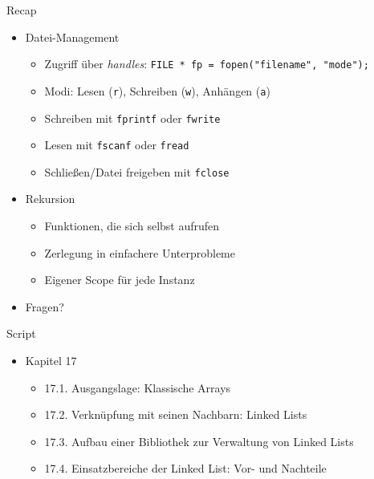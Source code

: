 
\begin{frame}[t,plain]
\titlepage
\end{frame}


\begin{frame}[fragile]{Recap}
%
\begin{itemize}
\item Datei-Management
	\begin{itemize}
	\item Zugriff über \emph{handles}:\tabto{4cm} \texttt{FILE * fp = fopen("filename", "mode");}
	\item Modi: Lesen (\texttt{r}), Schreiben (\texttt{w}), Anhängen (\texttt{a})
	\item Schreiben mit \texttt{fprintf} oder \texttt{fwrite}
	\item Lesen mit \texttt{fscanf} oder \texttt{fread}
	\item Schließen/Datei freigeben mit \texttt{fclose}
	\end{itemize}
\item Rekursion
	\begin{itemize}
	\item Funktionen, die sich selbst aufrufen
	\item Zerlegung in einfachere Unterprobleme
	\item Eigener Scope für jede Instanz
	\end{itemize}
\item Fragen?
\end{itemize}
%
\end{frame}


\begin{frame}{Script}

\begin{itemize}
\item Kapitel 17
	\begin{itemize}
	\item 17.1. Ausgangslage: Klassische Arrays
	\item 17.2. Verknüpfung mit seinen Nachbarn: Linked Lists
	\item 17.3. Aufbau einer Bibliothek zur Verwaltung von Linked Lists
	\item 17.4. Einsatzbereiche der Linked List: Vor- und Nachteile 
	\end{itemize}
\end{itemize}

\end{frame}


